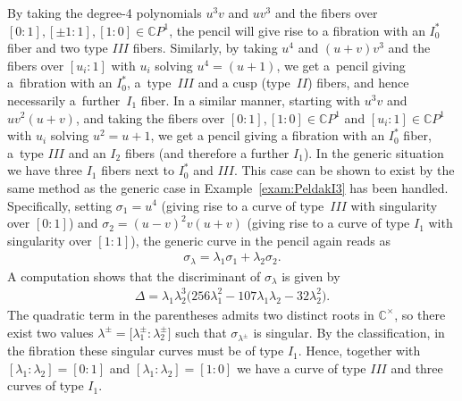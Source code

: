 \documentclass[pdftex]{sigma}
\newcommand{\C}{{\mathbb C}} %
\newcommand{\CP}[1]{\mathbb{C}P^{#1}} %
\numberwithin{equation}{section}
\begin{document}
\begin{Example}
By taking the degree-4 polynomials $u^3v$ and $uv^3$ and the fibers over $[0:1], [\pm 1 :1], [1:0]\allowbreak \in \CP{1}$, the pencil will give rise to a fibration with an $I_0^*$ fiber and two type $III$ fibers. Similarly, by taking $u^4$ and $(u+v)v^3$ and the fibers over $[u_i:1]$ with $u_i$ solving $u^4=(u+1)$, we get a~pencil giving a~fibration with an $I_0^*$, a~type~$III$ and a cusp (type~$II$) fibers, and hence necessarily a~further~$I_1$ fiber. In a similar manner, starting with $u^3v$ and $uv^2(u+v)$, and taking the fibers over $[0:1], [1:0]\in \CP{1}$ and $[u_i:1]\in \CP{1}$ with $u_i$ solving $u^2=u+1$, we get a pencil giving a fibration with an $I_0^*$ fiber, a~type $III$ and an $I_2$ fibers (and therefore a further $I_1$). In the generic situation we have three $I_1$ fibers next to $I_0^*$ and $III$. This case can be shown to exist by the same method as the generic case in Example~\ref{exam:PeldakI3} has been handled. Specifically, setting $\sigma_1 = u^4$ (giving rise to a curve of type~$III$ with singularity over $[0:1]$) and $\sigma_2 = (u-v)^2 v (u+v)$ (giving rise to a curve of type $I_1$ with singularity over $[1:1]$), the generic curve in the pencil again reads as
\begin{gather*}
 \sigma_{\lambda} = \lambda_1 \sigma_1 + \lambda_2 \sigma_2.
\end{gather*}
A computation shows that the discriminant of $\sigma_{\lambda}$ is given by
\begin{gather*}
 \Delta = \lambda_1 \lambda_2^3 \big(256 \lambda_1^2 - 107 \lambda_1 \lambda_2 - 32 \lambda_2^2 \big).
\end{gather*}
The quadratic term in the parentheses admits two distinct roots in $\C^{\times}$, so there exist two values $\lambda^{\pm} = \big[\lambda_1^{\pm} : \lambda_2^{\pm}\big]$ such that $\sigma_{\lambda^{\pm}}$ is singular. By the classification, in the fibration these singular curves must be of type $I_1$. Hence, together with $[\lambda_1 : \lambda_2] = [0:1]$ and $[\lambda_1 : \lambda_2] = [1:0]$ we have a curve of type $III$ and three curves of type $I_1$.
\end{Example}
\end{document}
